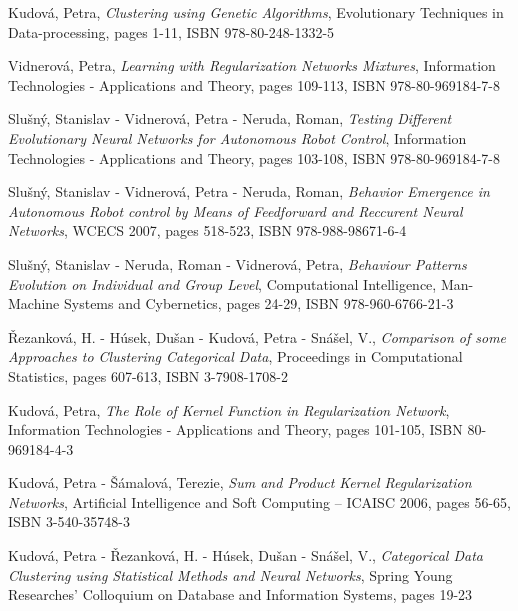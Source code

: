 \vspace{0.4em}
\noindent
Kudová, Petra, {\em Clustering using Genetic Algorithms}, Evolutionary Techniques in Data-processing, pages 1-11, ISBN 978-80-248-1332-5

\vspace{0.4em}
\noindent
Vidnerová, Petra, {\em Learning with Regularization Networks Mixtures}, Information Technologies - Applications and Theory, pages 109-113, ISBN 978-80-969184-7-8

\vspace{0.4em}
\noindent
Slušný, Stanislav - Vidnerová, Petra - Neruda, Roman, {\em Testing Different Evolutionary Neural Networks for Autonomous Robot Control}, Information Technologies - Applications and Theory, pages 103-108, ISBN 978-80-969184-7-8

\vspace{0.4em}
\noindent
Slušný, Stanislav - Vidnerová, Petra - Neruda, Roman, {\em Behavior Emergence in Autonomous Robot control by Means of Feedforward and Reccurent Neural Networks}, WCECS 2007, pages 518-523, ISBN 978-988-98671-6-4

\vspace{0.4em}
\noindent
Slušný, Stanislav - Neruda, Roman - Vidnerová, Petra, {\em Behaviour Patterns Evolution on Individual and Group Level}, Computational Intelligence, Man-Machine Systems and Cybernetics, pages 24-29, ISBN 978-960-6766-21-3

\vspace{0.4em}
\noindent
Řezanková, H. - Húsek, Dušan - Kudová, Petra - Snášel, V., {\em Comparison of some Approaches to Clustering Categorical Data}, Proceedings in Computational Statistics, pages 607-613, ISBN 3-7908-1708-2

\vspace{0.4em}
\noindent
Kudová, Petra, {\em The Role of Kernel Function in Regularization Network}, Information Technologies - Applications and Theory, pages 101-105, ISBN 80-969184-4-3

\vspace{0.4em}
\noindent
Kudová, Petra - Šámalová, Terezie, {\em Sum and Product Kernel Regularization Networks}, Artificial Intelligence and Soft Computing – ICAISC 2006, pages 56-65, ISBN 3-540-35748-3

\vspace{0.4em}
\noindent
Kudová, Petra - Řezanková, H. - Húsek, Dušan - Snášel, V., {\em Categorical Data Clustering using Statistical Methods and Neural Networks}, Spring Young Researches' Colloquium on Database and Information Systems, pages 19-23

